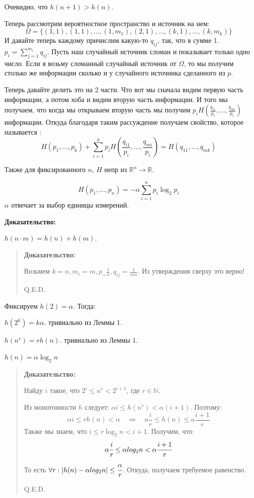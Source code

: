 Очевидно, что $h(n+1)>h(n)$.

Теперь рассмотрим вероятностное пространство и источник на нем:
$$\Omega = \{(1,1),(1,1),\ldots,(1,m_1),(2,1),\ldots,(k,1),\ldots,(k,m_k)\}$$
И давайте теперь каждому причислим какую-то $q_{ij}$, так, что в сумме 1. $p_i = \sum\limits_{j=1}^{m_i}q_{ij}$. Пусть наш случайный источник сломан и показывает  только одно число. Если я возьму сломанный случайный источник от $\Omega$, то мы получим столько же информации сколько и у случайного источника сделанного из $p$. 

Теперь давайте делить это на 2 части. Что вот мы сначала видим первую часть информации, а потом хоба и видим вторую часть информации. И того мы получаем, что когда мы открываем вторую часть мы получим $p_i H(\frac{q_{i1}}{p_i},\ldots, \frac{q_{mi}}{p_i} )$ информации. Откуда благодаря таким рассуждение получаем свойство, которое называется :
$$H(p_1,\ldots,p_k)+\sum\limits_{i=1}^kp_iH(\frac{q_{i1}}{p_i},\ldots, \frac{q_{mi}}{p_i}) = H(q_{11},\ldots, q_{mk})$$

Также для фиксированного $n$, $H$ непр из $\mathbb{R}^n\rightarrow \mathbb{R}$. 



$$H(p_1,\ldots,p_n)=-\alpha\sum\limits_{i=1}^np_i\log_2 p_i$$
$\alpha$ отвечает за выбор единицы измерений.

\textbf{Доказательство:}

 $h(n\cdot m) =h(n) + h(m)$.
\begin{quote}
     \textbf{Доказательство:}

     Возьмем  $k=n, m_i=m,p_ = \frac{1}{n},q_{ij} = \frac{1}{nm}$. Из утверждения сверху это верно!
     
\hfill Q.E.D.
\end{quote}
Фиксируем $h(2)=\alpha$. Тогда:

  $h(2^k)=k\alpha$. тривиально из Леммы 1.

  $h(n^r)=rh(n)$. тривиально из Леммы 1.

 $h(n) = \alpha \log_2n $
\begin{quote}
 \textbf{Доказательство:}

 Найду $i$ такое, что $2^i\leq n^r <2^{i+1}$, где $r\in \mathbb{N}$.
 
 Из монотонности $h$ следует: $\alpha i\leq h(n^r) <\alpha (i+1)$. Поэтому:
 $$\alpha i\leq rh(n) <\alpha \quad\Leftrightarrow\quad a\frac{i}{r}\leq h(n)\leq a\frac{i+1}{r}$$
Также мы знаем, что $i\leq r \log_2 n < i+1$. Получим, что:
$$\alpha \cfrac{i}{r}\leq \alpha log_2 n < \alpha \cfrac{i+1}{r}$$
То есть $\forall r :|h(n)-\alpha log_2n|\leq \cfrac{\alpha}{r}$. Откуда, получаем требуемое равенство.
 
 
 \hfill Q.E.D.
\end{quote}


